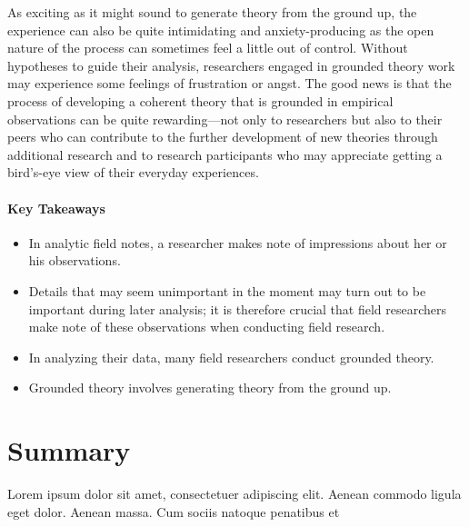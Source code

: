 As exciting as it might sound to generate theory from the ground up, the experience can also be quite intimidating and anxiety-producing as the open nature of the process can sometimes feel a little out of control. Without hypotheses to guide their analysis, researchers engaged in grounded theory work may experience some feelings of frustration or angst. The good news is that the process of developing a coherent theory that is grounded in empirical observations can be quite rewarding—not only to researchers but also to their peers who can contribute to the further development of new theories through additional research and to research participants who may appreciate getting a bird’s-eye view of their everyday experiences.

\paragraph{Key Takeaways}

\begin{itemize}
	\setlength{\itemsep}{0pt}
	\setlength{\parskip}{0pt}
	\setlength{\parsep}{0pt}
	
	\item In analytic field notes, a researcher makes note of impressions about her or his observations.
	\item Details that may seem unimportant in the moment may turn out to be important during later analysis; it is therefore crucial that field researchers make note of these observations when conducting field research.
	\item In analyzing their data, many field researchers conduct grounded theory.
	\item Grounded theory involves generating theory from the ground up.
	
\end{itemize}

\section{Summary}\label{ch13:summary}

Lorem ipsum dolor sit amet, consectetuer adipiscing elit. Aenean commodo ligula eget dolor. Aenean massa. Cum sociis natoque penatibus et
